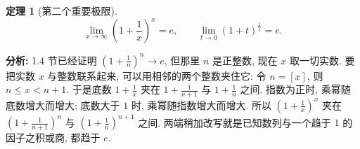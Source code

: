 \documentclass[UTF8,openany]{ctexbook}
\theoremstyle{chinesetextbook}
\newtheorem{theorem}{定理}[section]
\begin{document}
\begin{theorem}[第二个重要极限]
\[
\lim_{x\to\infty}\left(1+\frac1x\right)^x=e,\qquad\lim_{t\to0}(1+t)^{\frac1t}=e.
\]
\end{theorem}
\par\indent\textbf{分析:} 1.4 节已经证明 $\displaystyle\left(1+\frac1n\right)^n\to e$, 但那里 $n$ 是正整数, 现在 $x$ 取一切实数. 要把实数 $x$ 与整数联系起来, 可以用相邻的两个整数夹住它: 令 $n=[x]$, 则 $n\le x<n+1$. 于是底数 $\displaystyle1+\frac1x$ 夹在 $\displaystyle1+\frac1{n+1}$ 与 $\displaystyle1+\frac1n$ 之间. 指数为正时, 乘幂随底数增大而增大; 底数大于 $1$ 时, 乘幂随指数增大而增大. 所以 $\displaystyle\left(1+\frac1x\right)^x$ 夹在 $\displaystyle\left(1+\frac1{n+1}\right)^n$ 与 $\displaystyle\left(1+\frac1n\right)^{n+1}$ 之间. 两端稍加改写就是已知数列与一个趋于 $1$ 的因子之积或商, 都趋于 $e$.
\end{document}
